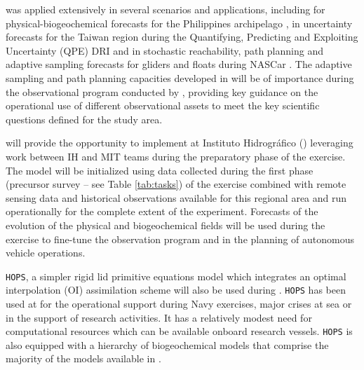 \mse was applied extensively in several scenarios and applications,
including for physical-biogeochemical forecasts for the Philippines
archipelago \cite{lermusiaux11}, in uncertainty forecasts for the
Taiwan region during the Quantifying, Predicting and Exploiting
Uncertainty (QPE) DRI \cite{gawarkiewicz11} and in stochastic
reachability, path planning and adaptive sampling forecasts for
gliders and floats during NASCar \cite{lermusiaux17}. The adaptive
sampling and path planning capacities developed in \mse will be of
importance during the observational program conducted by \proje,
providing key guidance on the operational use of different
observational assets to meet the key scientific questions defined for
the study area.


\proj will provide the opportunity to implement \mse at Instituto
Hidrogr\'{a}fico (\inste) leveraging work between IH and MIT teams
during the preparatory phase of the exercise. The model will be
initialized using data collected during the first phase (precursor
survey -- see Table \ref{tab:tasks}) of the exercise combined with
remote sensing data and historical observations available for this
regional area and run operationally for the complete extent of the
experiment. Forecasts of the evolution of the physical and
biogeochemical fields will be used during the exercise to fine-tune
the observation program and in the planning of autonomous vehicle
operations.

\texttt{HOPS}, a simpler rigid lid primitive equations model which
integrates an optimal interpolation (OI) assimilation scheme will also
be used during \proje. \texttt{HOPS} has been used at \inst for the
operational support during Navy exercises, major crises at sea or in
the support of research activities. It has a relatively modest need
for computational resources which can be available onboard research
vessels. \texttt{HOPS} is also equipped with a hierarchy of
biogeochemical models that comprise the majority of the models
available in \msee.

